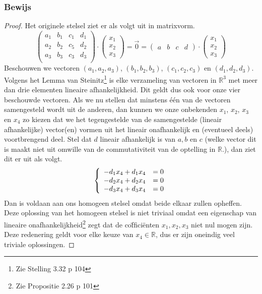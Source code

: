 \documentclass[lineaire_algebra_oplossingen.tex]{subfiles}
\begin{document}
\subsubsection*{Bewijs}
\begin{proof}
Het originele stelsel ziet er als volgt uit in matrixvorm.
\[
\begin{pmatrix}
a_1 & b_1 & c_1 & d_1\\
a_2 & b_2 & c_5 & d_2\\
a_3 & b_3 & c_3 & d_3\\
\end{pmatrix}
\cdot
\begin{pmatrix}
x_1\\ x_2\\x_3
\end{pmatrix}
= \vec{0}
= 
\begin{pmatrix}
a & b & c & d
\end{pmatrix}
\cdot
\begin{pmatrix}
x_1\\ x_2\\x_3
\end{pmatrix}
\]
Beschouwen we vectoren $(a_1,a_2,a_3)$, $(b_1,b_2,b_3)$, $(c_1,c_2,c_3)$ en $(d_1,d_2,d_3)$. Volgens het Lemma van Steinitz\footnote{Zie Stelling 3.32 p 104} is elke verzameling van vectoren in $\mathbb{R}^3$ met meer dan drie elementen lineaire afhankelijkheid. Dit geldt dus ook voor onze vier beschouwde vectoren. Als we nu stellen dat minstens \'e\'en van de vectoren samengesteld wordt uit de anderen, dan kunnen we onze onbekenden $x_1$, $x_2$, $x_3$ en $x_4$ zo kiezen dat we het tegengestelde van de samengestelde (lineair afhankelijke) vector(en) vormen uit het lineair onafhankelijk en (eventueel deels) voortbrengend deel. Stel dat $d$ lineair afhankelijk is van $a, b$ en $c$ (welke vector dit is maakt niet uit omwille van de commutativiteit van de optelling in $\mathbb{R}$.), dan ziet dit er uit als volgt.
\[
\left\lbrace
\begin{array}{c c}
-d_1x_4 + d_1x_4 &= 0 \\
-d_2x_4 + d_2x_4 &= 0 \\
-d_3x_4 + d_3x_4 &= 0 \\
\end{array}
\right.
\]
Dan is voldaan aan ons homogeen stelsel omdat beide elkaar zullen opheffen. Deze oplossing van het homogeen stelsel is niet triviaal omdat een eigenschap van lineaire onafhankelijkheid\footnote{Zie Propositie 2.26 p 101} zegt dat de co\"ffici\"enten $x_1,x_2,x_3$ niet nul mogen zijn.
Deze redenering geldt voor elke keuze van $x_4\in \mathbb{R}$, dus er zijn oneindig veel triviale oplossingen.
\end{proof}


\end{document}

